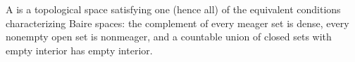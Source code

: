 A  is a topological space satisfying one (hence all) of the equivalent conditions characterizing Baire spaces: the complement of every meager set is dense, every nonempty open set is nonmeager, and a countable union of closed sets with empty interior has empty interior.
